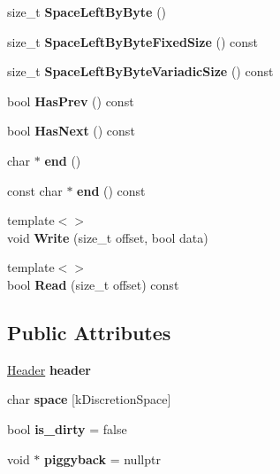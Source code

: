 \begin{DoxyCompactItemize}
size\+\_\+t {\bfseries Space\+Left\+By\+Byte} ()
\item 
\mbox{\label{struct_page_a9ff618dd17222aa6f6f8a07af8c1b815}} 
size\+\_\+t {\bfseries Space\+Left\+By\+Byte\+Fixed\+Size} () const
\item 
\mbox{\label{struct_page_a00f362caf7743c67e7d57c3c73bc1f14}} 
size\+\_\+t {\bfseries Space\+Left\+By\+Byte\+Variadic\+Size} () const
\item 
\mbox{\label{struct_page_a2e3e9f8d6c822551dc763d4ba68a37db}} 
bool {\bfseries Has\+Prev} () const
\item 
\mbox{\label{struct_page_a9f74a5064765540133e51847223e078a}} 
bool {\bfseries Has\+Next} () const
\item 
\mbox{\label{struct_page_a2cfaf268251e830949fb63ce3836b782}} 
char $\ast$ {\bfseries end} ()
\item 
\mbox{\label{struct_page_a2ad023288ac6729ac714585c239721e3}} 
const char $\ast$ {\bfseries end} () const
\item 
\mbox{\label{struct_page_ac0ca8728579e1a71952a43db15c0424b}} 
{\footnotesize template$<$$>$ }\\void {\bfseries Write} (size\+\_\+t offset, bool data)
\item 
\mbox{\label{struct_page_a50df8072539b45519238271b62fe2b66}} 
{\footnotesize template$<$$>$ }\\bool {\bfseries Read} (size\+\_\+t offset) const
\end{DoxyCompactItemize}
\subsection*{Public Attributes}
\begin{DoxyCompactItemize}
\item 
\mbox{\label{struct_page_a5a05bc31101b3d64fe207655a109ae8a}} 
\mbox{\hyperlink{struct_page_1_1_header}{Header}} {\bfseries header}
\item 
\mbox{\label{struct_page_a032524d4ea5e807b71592358e318dcc8}} 
char {\bfseries space} \mbox{[}k\+Discretion\+Space\mbox{]}
\item 
\mbox{\label{struct_page_ab3d8345d3c0ee1f541790866a907ec73}} 
bool {\bfseries is\+\_\+dirty} = false
\item 
\mbox{\label{struct_page_aad6646b2953f56cf61a30232383e2ed2}} 
void $\ast$ {\bfseries piggyback} = nullptr
\end{DoxyCompactItemize}


